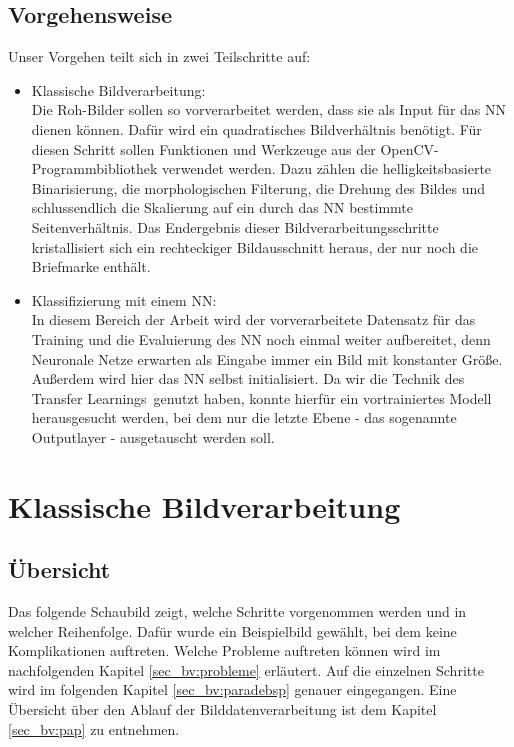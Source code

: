\documentclass[12pt,toc=bib,toc=listof]{scrreprt}
\begin{document}
\section{Vorgehensweise} %
\label{sec:vorgehensweise}

Unser Vorgehen teilt sich in zwei Teilschritte auf:
\begin{itemize}
\item Klassische Bildverarbeitung:\\ 
Die Roh-Bilder sollen so vorverarbeitet werden, dass sie als Input für das NN dienen können. Dafür wird ein quadratisches Bildverhältnis benötigt. Für diesen Schritt sollen Funktionen und Werkzeuge aus der OpenCV-Programmbibliothek verwendet werden. Dazu zählen die helligkeitsbasierte Binarisierung, die morphologischen Filterung, die Drehung des Bildes und schlussendlich die Skalierung auf ein durch das NN bestimmte Seitenverhältnis. Das Endergebnis dieser Bildverarbeitungsschritte kristallisiert sich ein rechteckiger Bildausschnitt heraus, der nur noch die Briefmarke enthält.

\item Klassifizierung mit einem NN:\\
In diesem Bereich der Arbeit wird der vorverarbeitete Datensatz für das Training und die Evaluierung des NN noch einmal weiter aufbereitet, denn Neuronale Netze erwarten als Eingabe immer ein Bild mit konstanter Größe. Außerdem wird hier das NN selbst initialisiert. Da wir die Technik des \dq Transfer Learnings\dq\ genutzt haben, konnte hierfür ein vortrainiertes Modell herausgesucht werden, bei dem nur die letzte Ebene - das sogenannte Outputlayer - ausgetauscht werden soll.

\end{itemize}



\chapter{Klassische Bildverarbeitung} %
\label{sec:klass_bv}

\section{Übersicht}
\label{sec_bv:übersicht}
Das folgende Schaubild zeigt, welche Schritte vorgenommen werden und in welcher Reihenfolge. Dafür wurde ein Beispielbild gewählt, bei dem keine Komplikationen auftreten. Welche Probleme auftreten können wird im nachfolgenden Kapitel \ref{sec_bv:probleme} erläutert. Auf die einzelnen Schritte wird im folgenden Kapitel \ref{sec_bv:paradebsp} genauer eingegangen. Eine Übersicht über den Ablauf der Bilddatenverarbeitung ist dem Kapitel \ref{sec_bv:pap} zu entnehmen.
\end{document}
